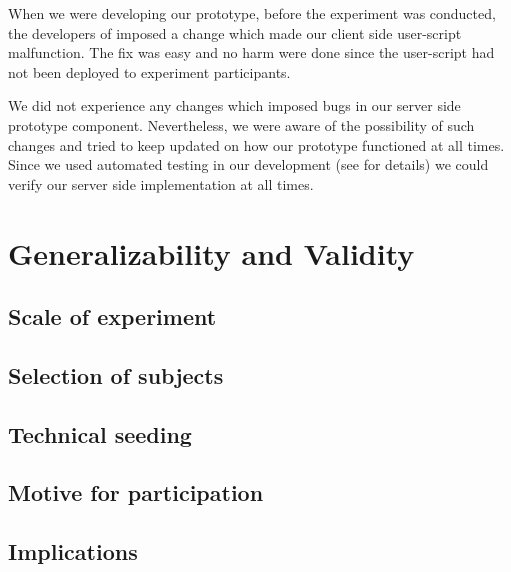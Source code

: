 When we were developing our prototype, before the experiment was conducted,
the developers of \urort{} imposed a change which made our client side
user-script malfunction. The fix was easy and no harm were done since the
user-script had not been deployed to experiment participants.

We did not experience any changes which imposed bugs in our server side
prototype component. Nevertheless, we were aware of the possibility of such
changes and tried to keep updated on how our prototype functioned at all
times. Since we used automated testing in our development (see
 for details) we could verify
our server side implementation at all times.

\section{Generalizability and Validity}

\subsection{Scale of experiment}


\subsection{Selection of subjects}


\subsection{Technical seeding}


\subsection{Motive for participation}


\subsection{Implications}

